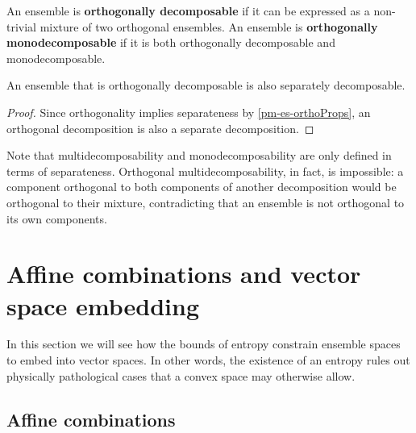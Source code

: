 \begin{mathSection}
\begin{defn}
	An ensemble is \textbf{orthogonally decomposable} if it can be expressed as a non-trivial mixture of two orthogonal ensembles. An ensemble is \textbf{orthogonally monodecomposable} if it is both orthogonally decomposable and monodecomposable.
\end{defn}

\begin{coro}
	An ensemble that is orthogonally decomposable is also separately decomposable.
\end{coro}

\begin{proof}
	Since orthogonality implies separateness by \ref{pm-es-orthoProps}, an orthogonal decomposition is also a separate decomposition.
\end{proof}

\begin{remark}
	 Note that multidecomposability and monodecomposability are only defined in terms of separateness. Orthogonal multidecomposability, in fact, is impossible: a component orthogonal to both components of another decomposition would be orthogonal to their mixture, contradicting that an ensemble is not orthogonal to its own components.
\end{remark}
\end{mathSection}

\section{Affine combinations and vector space embedding}

In this section we will see how the bounds of entropy constrain ensemble spaces to embed into vector spaces. In other words, the existence of an entropy rules out physically pathological cases that a convex space may otherwise allow.


\subsection{Affine combinations}

